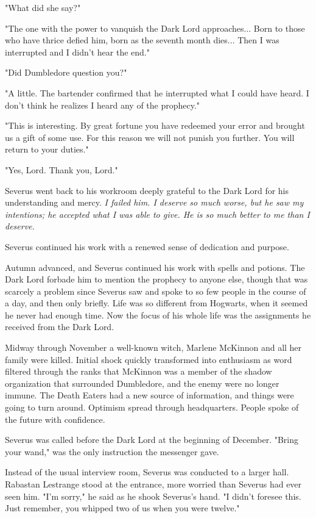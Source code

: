 \documentclass[a4paper,11pt]{article}
\begin{document}
"What did she say?"

"The one with the power to vanquish the Dark Lord approaches... Born to those who have thrice defied him, born as the seventh month dies... Then I was interrupted and I didn't hear the end."

"Did Dumbledore question you?"

"A little. The bartender confirmed that he interrupted what I could have heard. I don't think he realizes I heard any of the prophecy."

"This is interesting. By great fortune you have redeemed your error and brought us a gift of some use. For this reason we will not punish you further. You will return to your duties."

"Yes, Lord. Thank you, Lord."

Severus went back to his workroom deeply grateful to the Dark Lord for his understanding and mercy. \emph{I failed him. I deserve so much worse, but he saw my intentions; he accepted what I was able to give. He is so much better to me than I deserve.}

Severus continued his work with a renewed sense of dedication and purpose.

Autumn advanced, and Severus continued his work with spells and potions. The Dark Lord forbade him to mention the prophecy to anyone else, though that was scarcely a problem since Severus saw and spoke to so few people in the course of a day, and then only briefly. Life was so different from Hogwarts, when it seemed he never had enough time. Now the focus of his whole life was the assignments he received from the Dark Lord.

Midway through November a well-known witch, Marlene McKinnon and all her family were killed. Initial shock quickly transformed into enthusiasm as word filtered through the ranks that McKinnon was a member of the shadow organization that surrounded Dumbledore, and the enemy were no longer immune. The Death Eaters had a new source of information, and things were going to turn around. Optimism spread through headquarters. People spoke of the future with confidence.

Severus was called before the Dark Lord at the beginning of December. "Bring your wand," was the only instruction the messenger gave.

Instead of the usual interview room, Severus was conducted to a larger hall. Rabastan Lestrange stood at the entrance, more worried than Severus had ever seen him. "I'm sorry," he said as he shook Severus's hand. "I didn't foresee this. Just remember, you whipped two of us when you were twelve."
\end{document}
